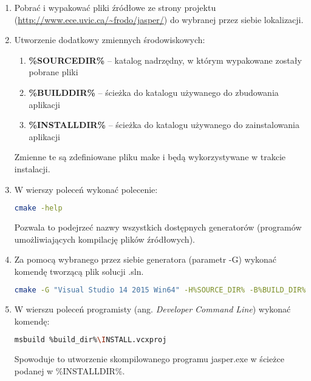 \begin{enumerate}
	\item Pobrać i wypakować pliki źródłowe ze strony projektu (\url{http://www.ece.uvic.ca/~frodo/jasper/}) do wybranej przez siebie lokalizacji.
	
	\item Utworzenie dodatkowy zmiennych środowiskowych:
	\begin{enumerate}
		\item \textbf{\%SOURCE\textunderscore DIR\%} -- katalog nadrzędny, w którym wypakowane zostały pobrane pliki
		\item \textbf{\%BUILD\textunderscore DIR\%} -- ścieżka do katalogu używanego do zbudowania aplikacji
		\item \textbf{\%INSTALL\textunderscore DIR\%} -- ścieżka do katalogu używanego do zainstalowania aplikacji
	\end{enumerate}
	Zmienne te są zdefiniowane pliku make i będą wykorzystywane w trakcie instalacji.
	
	\item W wierszy poleceń wykonać polecenie:
	
	\begin{lstlisting}[language=bash]
	cmake -help
	\end{lstlisting}
	
	Pozwala to podejrzeć nazwy wszystkich dostępnych generatorów (programów umożliwiających kompilację plików źródłowych).
	
	\item Za pomocą wybranego przez siebie generatora (parametr -G) wykonać komendę tworzącą plik solucji .sln.
	
	\begin{lstlisting}[language=bash]
	cmake -G "Visual Studio 14 2015 Win64" -H%SOURCE_DIR% -B%BUILD_DIR% ^ -DCMAKE_INSTALL_PREFIX=%INSTALL_DIR%
	\end{lstlisting}
	
	\item W wierszu poleceń programisty (ang. \textit{Developer Command Line}) wykonać komendę:
	
	\begin{lstlisting}[language=bash]
	msbuild %build_dir%\INSTALL.vcxproj
	\end{lstlisting}
	
	Spowoduje to utworzenie skompilowanego programu jasper.exe w ścieżce podanej w \%INSTALL\textunderscore DIR\%.
\end{enumerate}



